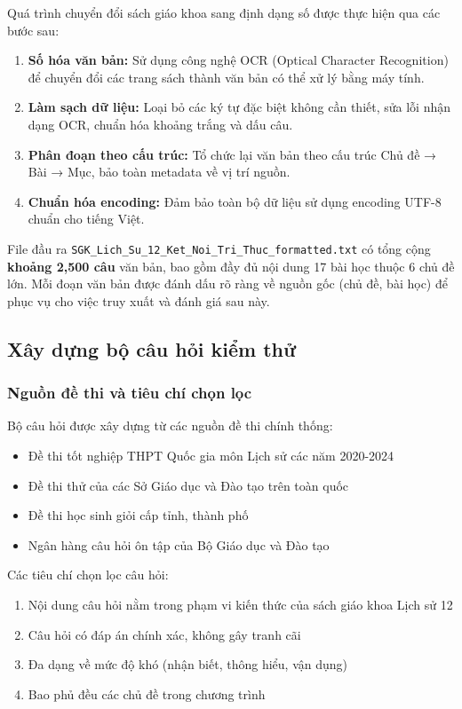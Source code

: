 Quá trình chuyển đổi sách giáo khoa sang định dạng số được thực hiện qua các bước sau:

\begin{enumerate}
    \item \textbf{Số hóa văn bản:} Sử dụng công nghệ OCR (Optical Character Recognition) để chuyển đổi các trang sách thành văn bản có thể xử lý bằng máy tính.
    
    \item \textbf{Làm sạch dữ liệu:} Loại bỏ các ký tự đặc biệt không cần thiết, sửa lỗi nhận dạng OCR, chuẩn hóa khoảng trắng và dấu câu.
    
    \item \textbf{Phân đoạn theo cấu trúc:} Tổ chức lại văn bản theo cấu trúc Chủ đề → Bài → Mục, bảo toàn metadata về vị trí nguồn.
    
    \item \textbf{Chuẩn hóa encoding:} Đảm bảo toàn bộ dữ liệu sử dụng encoding UTF-8 chuẩn cho tiếng Việt.
\end{enumerate}

File đầu ra \texttt{SGK\_Lich\_Su\_12\_Ket\_Noi\_Tri\_Thuc\_formatted.txt} có tổng cộng \textbf{khoảng 2,500 câu} văn bản, bao gồm đầy đủ nội dung 17 bài học thuộc 6 chủ đề lớn. Mỗi đoạn văn bản được đánh dấu rõ ràng về nguồn gốc (chủ đề, bài học) để phục vụ cho việc truy xuất và đánh giá sau này.

\subsection{Xây dựng bộ câu hỏi kiểm thử}

\subsubsection{Nguồn đề thi và tiêu chí chọn lọc}

Bộ câu hỏi được xây dựng từ các nguồn đề thi chính thống:
\begin{itemize}
    \item Đề thi tốt nghiệp THPT Quốc gia môn Lịch sử các năm 2020-2024
    \item Đề thi thử của các Sở Giáo dục và Đào tạo trên toàn quốc
    \item Đề thi học sinh giỏi cấp tỉnh, thành phố
    \item Ngân hàng câu hỏi ôn tập của Bộ Giáo dục và Đào tạo
\end{itemize}

Các tiêu chí chọn lọc câu hỏi:
\begin{enumerate}
    \item Nội dung câu hỏi nằm trong phạm vi kiến thức của sách giáo khoa Lịch sử 12
    \item Câu hỏi có đáp án chính xác, không gây tranh cãi
    \item Đa dạng về mức độ khó (nhận biết, thông hiểu, vận dụng)
    \item Bao phủ đều các chủ đề trong chương trình
\end{enumerate}

